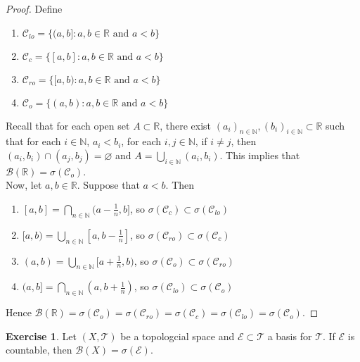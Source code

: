 \documentclass{book}
\theoremstyle{definition}
\newtheorem{ex}[definition]{Exercise}
\newcommand{\sig}{\sigma}
\newcommand{\N}{\mathbb{N}}
\newcommand{\R}{\mathbb{R}}
\newcommand{\MB}{\mathcal{B}}
\newcommand{\MC}{\mathcal{C}}
\newcommand{\ME}{\mathcal{E}}
\newcommand{\MT}{\mathcal{T}}
\DeclareMathOperator*{\0}{\mbf{0}}
\DeclareMathOperator*{\1}{\mbf{1}}
\begin{document}
	\begin{proof}
		Define 
		\begin{enumerate}
			\item $\MC_{lo} = \{(a,b]:a,b \in \R \text{ and } a<b\}$\\
			\item $\MC_{c} = \{[a,b]:a,b \in \R \text{ and } a<b\}$\\
			\item $\MC_{ro} = \{[a,b):a,b \in \R \text{ and } a<b\}$\\
			\item $\MC_{o} = \{(a,b):a,b \in \R \text{ and } a<b\}$\\
		\end{enumerate} 
		Recall that for each open set $A \subset \R$, there exist $(a_i)_{n \in \N}, (b_i)_{i \in \N} \subset \R$ such that for each $i \in \N$, $a_i < b_i$, for each $i,j \in \N$, if $i \neq j$, then $(a_i,b_i) \cap (a_j, b_j) = \varnothing$ and $A = \bigcup\limits_{i \in \N}(a_i, b_i)$. This implies that $\MB(\R) = \sig(\MC_o)$. \vspace{2mm}\\
		Now, let $a,b \in \R$. Suppose that $a<b$. Then 
		\begin{enumerate}
			\item $[a,b] = \bigcap\limits_{n \in \N}(a- \frac{1}{n}, b]$, so $\sig(\MC_{c}) \subset \sig(\MC_{lo})$\\
			\item $[a,b) = \bigcup\limits_{n \in \N} [a,b-\frac{1}{n}]$, so $\sig(\MC_{ro}) \subset \sig(\MC_{c})$ \\
			\item $(a,b) = \bigcup\limits_{n \in \N} [a+\frac{1}{n},b)$, so $\sig(\MC_{o}) \subset \sig(\MC_{ro})$\\
			\item $(a,b] = \bigcap\limits_{n \in \N} (a,b+\frac{1}{n})$, so $\sig(\MC_{lo}) \subset \sig(\MC_{o})$\\
		\end{enumerate}
		Hence $\MB(\R) = \sig(\MC_o) = \sig(\MC_{ro}) = \sig(\MC_{c}) = \sig(\MC_{lo}) = \sig(\MC_{o})$. 
	\end{proof}

	\begin{ex}
		Let $(X, \MT)$ be a topologcial space and $\ME \subset \MT$ a basis for $\MT$. If $\ME$ is countable, then $\MB(X) = \sig(\ME)$.  
	\end{ex}
\end{document}

